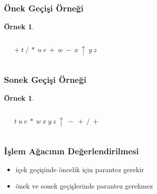 \documentclass[dvipsnames]{beamer}
\theoremstyle{definition}
\theoremstyle{example}
\newtheorem{ornek}[theorem]{Örnek}
\theoremstyle{plain}
\begin{document}
\begin{frame}
  \frametitle{Önek Geçişi Örneği}

  \begin{ornek}
    \begin{columns}
      \begin{center}
      \end{center}

      $+ ~ t ~ / ~ * ~ u ~ v ~ + ~ w ~ - ~ x ~ \uparrow ~ y ~ z$
    \end{columns}
  \end{ornek}
\end{frame}

\begin{frame}
  \frametitle{Sonek Geçişi Örneği}

  \begin{ornek}
    \begin{columns}
      \begin{center}
      \end{center}

      $t ~ u ~ v ~ * ~ w ~ x ~ y ~ z ~ \uparrow ~ - ~ + ~ / ~ +$
    \end{columns}
  \end{ornek}
\end{frame}

\begin{frame}
  \frametitle{İşlem Ağacının Değerlendirilmesi}

  \begin{itemize}
    \item içek geçişinde öncelik için parantez gerekir
    \item önek ve sonek geçişlerinde parantez gerekmez
  \end{itemize}
\end{frame}
\end{document}
